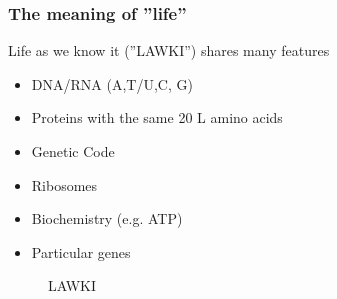 \documentclass[]{article}
\begin{document}
\subsubsection{The meaning of ''life''}
Life as we know it (''LAWKI'') shares many features
\begin{itemize}
	\item DNA/RNA (A,T/U,C, G)
	\item Proteins with the same 20 L amino acids
	\item Genetic Code
	\item Ribosomes
	\item Biochemistry (e.g. ATP)
	\item Particular genes
\end{itemize}

\begin{figure}[H]
	\caption{LAWKI}\label{fig:LUCA_figs} 
	

\end{figure}
\end{document}

